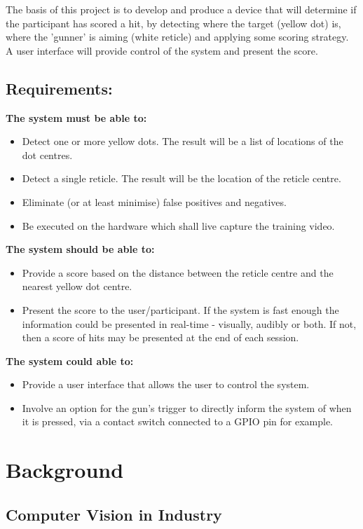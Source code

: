 \documentclass[final]{cmpreport_02}
\begin{document}
The basis of this project is to develop and produce a device that will determine if the participant has scored a hit, by detecting where the target (yellow dot) is, where the 'gunner' is aiming (white reticle) and applying some scoring strategy. A user interface will provide control of the system and present the score.

\subsection*{Requirements:}
\textbf{The system must be able to:}
\begin{itemize}
	\item Detect one or more yellow dots. The result will be a list of locations of the dot centres.
	\item Detect a single reticle. The result will be the location of the reticle centre.
	\item Eliminate (or at least minimise) false positives and negatives.
	\item Be executed on the hardware which shall live capture the training video.
\end{itemize}
\textbf{The system should be able to:}
\begin{itemize}
	\item Provide a score based on the distance between the reticle centre and the nearest yellow dot centre. 
	\item Present the score to the user/participant. If the system is fast enough the information could be presented in real-time - visually, audibly or both. If not, then a score of hits may be presented at the end of each session.
\end{itemize}
\textbf{The system could able to:}
\begin{itemize}
	\item Provide a user interface that allows the user to control the system.
	\item Involve an option for the gun's trigger to directly inform the system of when it is pressed, via a contact switch connected to a GPIO pin for example.	
\end{itemize}

\section{Background}

\subsection{Computer Vision in Industry}
\end{document}
